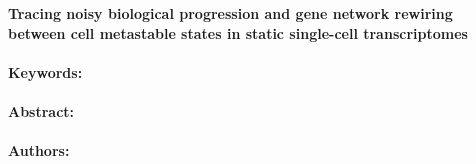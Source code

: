 \noindent
\large {\bf Tracing noisy biological progression and gene network rewiring between cell metastable states in static single-cell transcriptomes} 


\normalsize 


\noindent \paragraph{Keywords:} 

\noindent \paragraph{Abstract:} 



\noindent \paragraph{Authors:} 

